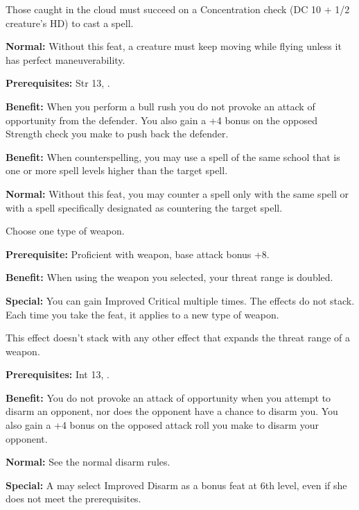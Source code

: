 Those caught in the cloud must succeed on a Concentration check (DC 10 + 1/2 creature's 
HD) to cast a spell.

\textbf{Normal:} Without this feat, a creature must keep moving while flying unless 
it has perfect maneuverability.


\textbf{Prerequisites:} Str 13, .

\textbf{Benefit:} When you perform a bull rush you do not provoke an attack of 
opportunity from the defender. You also gain a +4 bonus on the opposed Strength 
check you make to push back the defender.


\textbf{Benefit:} When counterspelling, you may use a spell of the same school 
that is one or more spell levels higher than the target spell.

\textbf{Normal:} Without this feat, you may counter a spell only with the same 
spell or with a spell specifically designated as countering the target spell.


Choose one type of weapon.

\textbf{Prerequisite:} Proficient with weapon, base attack bonus +8.

\textbf{Benefit:} When using the weapon you selected, your threat range is doubled.

\textbf{Special:} You can gain Improved Critical multiple times. The effects do 
not stack. Each time you take the feat, it applies to a new type of weapon.

This effect doesn't stack with any other effect that expands the threat range of 
a weapon.


\textbf{Prerequisites:} Int 13, .

\textbf{Benefit:} You do not provoke an attack of opportunity when you attempt 
to disarm an opponent, nor does the opponent have a chance to disarm you. You also 
gain a +4 bonus on the opposed attack roll you make to disarm your opponent.

\textbf{Normal:} See the normal disarm rules.

\textbf{Special:} A  may select Improved Disarm as a bonus feat at 6th level, even if she does 
not meet the prerequisites.

